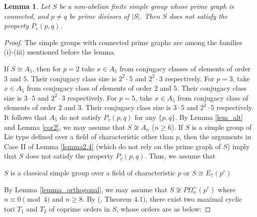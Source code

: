 \documentclass[11pt, a4paper]{article}
\numberwithin{equation}{section}
\theoremstyle{plain} %
\newtheorem{lemma}[theorem]{Lemma}
\begin{document}
\begin{lemma}\label{lemma2.6}
Let $S$ be a non-abelian finite simple group whose prime graph is connected, and $p\neq q$ be prime divisors of $|S|$. Then $S$ does not satisfy the property $P_v(p,q)$. 
\end{lemma}
\begin{proof} The simple groups with connected prime graphs are among the families (i)-(iii) mentioned before the lemma.  

If $S\cong A_5$, then for $p=2$ take $x\in A_5$ from conjugacy classes of elements of order $3$ and $5$. Their conjugacy class size is $2^2\cdot 5$ and $2^2\cdot 3$ respectively. For $p=3$, take $x\in A_5$ from conjugacy class of elements of order $2$ and $5$. Their conjugacy class size is $3\cdot 5$ and $2^2\cdot 3$ respectively. 
For $p=5$, take $x\in A_5$ from conjugacy class of elements of order $2$ and $3$. Their conjugacy class size is $3\cdot 5$ and $2^2\cdot 5$ respectively. It follows that $A_5$ do not satisfy $P_v(p,q)$ for any $\{p,q\}$. By Lemma \ref{lem_alt} and Lemma \ref{cor2}, we may assume that $S\not\cong A_n$ ($n\geq 6$). 
If $S$ is a simple group of Lie type defined over a field of characteristic other than $p$, then the arguments in Case II of Lemma \ref{lemma2.4} (which do not rely on the prime graph of $S$) imply that $S$ does not satisfy the property $P_v(p,q)$. Thus, we assume that 
\begin{center}
$S$ is a classical simple group over a field of characteristic $p$ \hskip5mm or \hskip5mm $S\cong E_7(p^r)$ 
\end{center}
By Lemma \ref{lemma_orthogonal}, we may assume that $S\not \cong P\Omega_n^+(p^r)$ where $n\equiv 0\pmod{4}$ and $n\ge 8$. By (\cite{MR2507573}, Theorem 4.1), there exist two maximal cyclic tori $T_1$ and $T_2$ of coprime orders in $S$, whose orders are as below: 


\end{proof}
\end{document}
